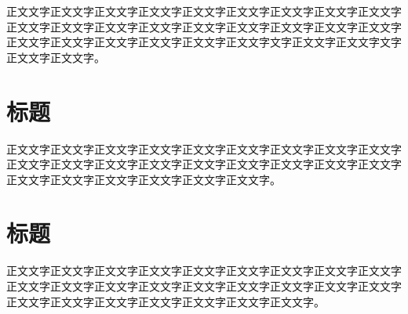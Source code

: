 正文文字正文文字正文文字正文文字正文文字正文文字正文文字正文文字正文文字正文文字正文文字正文文字正文文字正文文字正文文字正文文字正文文字正文文字正文文字正文文字正文文字正文文字正文文字正文文字文字正文文字正文文字文字正文文字正文文字。




\section{标题}

正文文字正文文字正文文字正文文字正文文字正文文字正文文字正文文字正文文字正文文字正文文字正文文字正文文字正文文字正文文字正文文字正文文字正文文字正文文字正文文字正文文字正文文字正文文字正文文字。

\section{标题}

正文文字正文文字正文文字正文文字正文文字正文文字正文文字正文文字正文文字正文文字正文文字正文文字正文文字正文文字正文文字正文文字正文文字正文文字正文文字正文文字正文文字正文文字正文文字正文文字正文文字。
